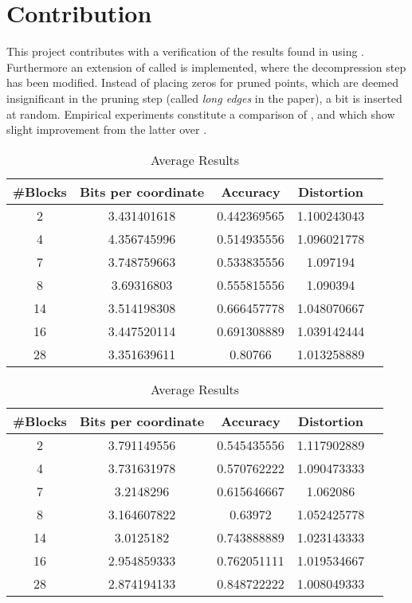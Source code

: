 \section{Contribution}
\label{contribution}
This project contributes with a verification of the results found in \cite{wagner17} using \qs{}. Furthermore an extension of \qs{} called \qsr{} is implemented, where the decompression step has been modified. Instead of placing zeros for pruned points, which are deemed insignificant in the pruning step (called \textit{long edges} in the paper), a bit is inserted at random. Empirical experiments constitute a comparison of \qs{}, \grid{} and \qsr{} which show slight improvement from the latter over \qs{}.

\begin{table}[h!]
	\centering
	\caption{Average Results \mnist{} \qs{}}
	\label{table:avg_mnist_qs}
	\begin{tabular}{ccccc}
		\hline
		\#Blocks & Bits per coordinate & Accuracy  & Distortion \\ \hline
		2 & 3.431401618 & 0.442369565 & 1.100243043  \\
		4 & 4.356745996 & 0.514935556 & 1.096021778  \\
		7 & 3.748759663 & 0.533835556 & 1.097194 \\
		8 & 3.69316803 & 0.555815556 & 1.090394 \\
		14 & 3.514198308 & 0.666457778 & 1.048070667 \\
		16 & 3.447520114 & 0.691308889 & 1.039142444 \\
		28 & 3.351639611 & 0.80766 & 1.013258889 \\
		\hline
	\end{tabular}
\end{table}

\begin{table}[h!]
	\centering
	\caption{Average Results \mnist{} \qsr{}}
	\label{table:avg_mnist_qsr}
	\begin{tabular}{ccccc}
		\hline
		\#Blocks & Bits per coordinate & Accuracy  & Distortion \\ \hline
		2 & 3.791149556 & 0.545435556 & 1.117902889  \\
		4 & 3.731631978 & 0.570762222 & 1.090473333  \\
		7 & 3.2148296 & 0.615646667 & 1.062086 \\
		8 & 3.164607822 & 0.63972 & 1.052425778 \\
		14 & 3.0125182 & 0.743888889 & 1.023143333 \\
		16 & 2.954859333 & 0.762051111 & 1.019534667 \\
		28 & 2.874194133 & 0.848722222 & 1.008049333 \\
		\hline
	\end{tabular}
\end{table}

